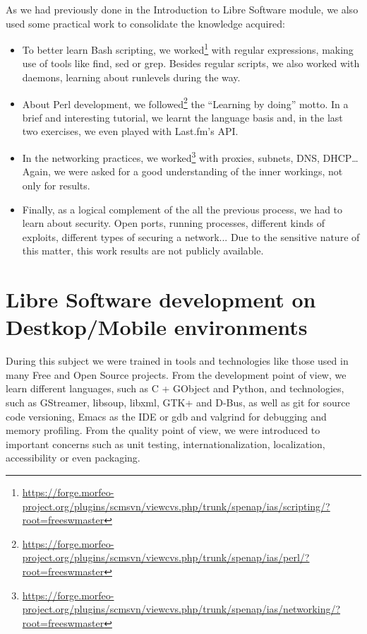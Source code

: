As we had previously done in the Introduction to Libre Software module, we also used some
practical work to consolidate the knowledge acquired:

\begin{itemize}
\item To better learn Bash scripting, we worked\footnote{\url{https://forge.morfeo-project.org/plugins/scmsvn/viewcvs.php/trunk/spenap/ias/scripting/?root=freeswmaster}} with regular expressions, making use
of tools like find, sed or grep. Besides regular scripts, we also worked with daemons,
learning about runlevels during the way.

\item About Perl development, we followed\footnote{\url{https://forge.morfeo-project.org/plugins/scmsvn/viewcvs.php/trunk/spenap/ias/perl/?root=freeswmaster}} the ``Learning by doing'' motto. In a brief and interesting tutorial,
we learnt the language basis and, in the last two exercises, we even played with Last.fm's API.

\item In the networking practices, we worked\footnote{\url{https://forge.morfeo-project.org/plugins/scmsvn/viewcvs.php/trunk/spenap/ias/networking/?root=freeswmaster}} with proxies, subnets, DNS, DHCP\dots Again, we were asked
for a good understanding of the inner workings, not only for results. 

\item Finally, as a logical complement of the all the previous process, we had to learn about security. Open
ports, running processes, different kinds of exploits, different types of securing a network... Due to the sensitive
nature of this matter, this work results are not publicly available. 
\end{itemize}

\section{Libre Software development on Destkop/Mobile environments}

During this subject we were trained in tools and technologies like those used in many Free and Open Source projects.
From the development point of view, we learn different languages, such as C + GObject and Python, and technologies, such as
GStreamer, libsoup, libxml, GTK+ and D-Bus, as well as git for source code versioning, Emacs as the IDE or gdb and valgrind for debugging and
memory profiling.
From the quality point of view, we were introduced to important concerns such as unit testing, internationalization,
localization, accessibility or even packaging.

